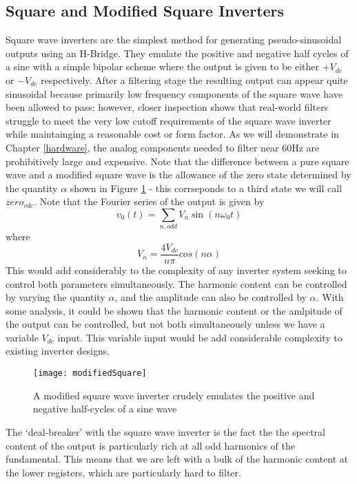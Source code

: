 \subsection{Square and Modified Square Inverters}
\label{squareApproach}
Square wave inverters are the simplest method for generating pseudo-sinusoidal outputs using an H-Bridge. They emulate the positive and negative half cycles of a sine with a simple bipolar scheme where the output is given to be either $+V_{dc}$ or $-V_{dc}$ respectively. After a filtering stage the resulting output can appear quite sinusoidal because primarily low frequency components of the square wave have been allowed to pass; however, closer inspection shows that real-world filters struggle to meet the very low cutoff requirements of the square wave inverter while maintainging a reasonable cost or form factor. As we will demonstrate in Chapter \ref{hardware}, the analog components needed to filter near 60Hz are prohibitively large and expensive. Note that the difference between a pure square wave and a modified square wave is the allowance of the zero state determined by the quantity $\alpha$ shown in Figure \ref{modifiedSquare} - this corrseponds to a third state we will call $zero_{vdc}$. Note that the Fourier series of the output is given by 
\begin{equation}
v_0(t)=\sum\limits_{n,odd}V_n\sin{(n\omega_0t)}
\end{equation}
where 
\begin{equation}
V_n=\frac{4V_{dc}}{n\pi}cos{(n\alpha)}
\end{equation}
This would add considerably to the complexity of any inverter system seeking to control both parameters simultaneously. The harmonic content can be controlled by varying the quantity $\alpha$, and the amplitude can also be controlled by $\alpha$. With some analysis, it could be shown that the harmonic content or the amlpitude of the output can be controlled, but not both simultaneously unless we have a variable $V_{dc}$ input. This variable input would be add considerable complexity to existing inverter designs.  

\begin{figure}[h]
\centering
\texttt{[image: modifiedSquare]}
\caption{A modified square wave inverter crudely emulates the positive and negative half-cycles of a sine wave \cite{inverterFourier}}
\label{modifiedSquare}
\end{figure}

The `deal-breaker' with the square wave inverter is the fact the the spectral content of the output is particularly rich at all odd harmonics of the fundamental. This means that we are left with a bulk of the harmonic content at the lower registers, which are particularly hard to filter. 

